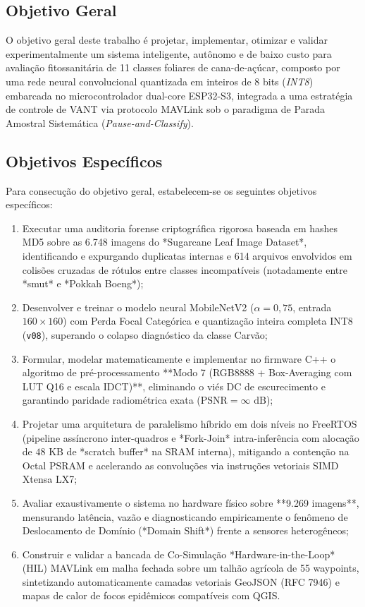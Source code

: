 \subsection{Objetivo Geral}

O objetivo geral deste trabalho é projetar, implementar, otimizar e validar experimentalmente um sistema inteligente, autônomo e de baixo custo para avaliação fitossanitária de 11 classes foliares de cana-de-açúcar, composto por uma rede neural convolucional quantizada em inteiros de 8 bits (\textit{INT8}) embarcada no microcontrolador dual-core ESP32-S3, integrada a uma estratégia de controle de VANT via protocolo MAVLink sob o paradigma de Parada Amostral Sistemática (\textit{Pause-and-Classify}).

\subsection{Objetivos Específicos}

Para consecução do objetivo geral, estabelecem-se os seguintes objetivos específicos:
\begin{enumerate}
    \item Executar uma auditoria forense criptográfica rigorosa baseada em hashes MD5 sobre as 6.748 imagens do *Sugarcane Leaf Image Dataset*, identificando e expurgando duplicatas internas e 614 arquivos envolvidos em colisões cruzadas de rótulos entre classes incompatíveis (notadamente entre *smut* e *Pokkah Boeng*);
    \item Desenvolver e treinar o modelo neural MobileNetV2 ($\alpha=0,75$, entrada $160 \times 160$) com Perda Focal Categórica e quantização inteira completa INT8 (\texttt{v08}), superando o colapso diagnóstico da classe Carvão;
    \item Formular, modelar matematicamente e implementar no firmware C++ o algoritmo de pré-processamento **Modo 7 (RGB8888 + Box-Averaging com LUT Q16 e escala IDCT)**, eliminando o viés DC de escurecimento e garantindo paridade radiométrica exata ($\text{PSNR} = \infty\text{ dB}$);
    \item Projetar uma arquitetura de paralelismo híbrido em dois níveis no FreeRTOS (pipeline assíncrono inter-quadros e *Fork-Join* intra-inferência com alocação de $48\text{ KB}$ de *scratch buffer* na SRAM interna), mitigando a contenção na Octal PSRAM e acelerando as convoluções via instruções vetoriais SIMD Xtensa LX7;
    \item Avaliar exaustivamente o sistema no hardware físico sobre **9.269 imagens**, mensurando latência, vazão e diagnosticando empiricamente o fenômeno de Deslocamento de Domínio (*Domain Shift*) frente a sensores heterogêneos;
    \item Construir e validar a bancada de Co-Simulação *Hardware-in-the-Loop* (HIL) MAVLink em malha fechada sobre um talhão agrícola de 55 waypoints, sintetizando automaticamente camadas vetoriais GeoJSON (RFC 7946) e mapas de calor de focos epidêmicos compatíveis com QGIS.
\end{enumerate}


